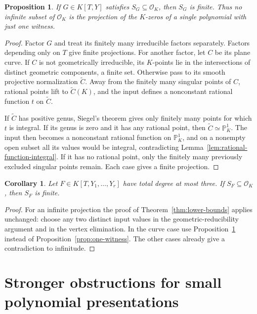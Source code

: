 \documentclass[11pt]{article}
\newtheorem{proposition}[theorem]{Proposition}
\newtheorem{corollary}[theorem]{Corollary}
\theoremstyle{definition}
\begin{document}
\begin{proposition}\label{prop:one-witness-finite}
If $G\in K[T,Y]$ satisfies $S_G\subseteq\mathcal O_K$, then $S_G$ is finite.
Thus no infinite subset of $\mathcal O_K$ is the projection of the
$K$-zeros of a single polynomial with just one witness.
\end{proposition}
\begin{proof}
Factor $G$ and treat its finitely many irreducible factors separately.
Factors depending only on $T$ give finite projections.  For another factor,
let $C$ be its plane curve.  If $C$ is not geometrically irreducible, its
$K$-points lie in the intersections of distinct geometric components,
a finite set.  Otherwise pass to its smooth projective normalization
$\widetilde C$.  Away from the finitely many singular points of $C$,
rational points lift to $\widetilde C(K)$, and the input defines a
nonconstant rational function $t$ on $\widetilde C$.

If $\widetilde C$ has positive genus, Siegel's theorem gives only finitely
many points for which $t$ is integral.  If its genus is zero and it has
any rational point, then $\widetilde C\simeq\mathbb P^1_K$.
The input then becomes a nonconstant rational function on
$\mathbb P^1_K$, and on a nonempty open subset all its values would be
integral, contradicting Lemma~\ref{lem:rational-function-integral}.
If it has no rational point, only the finitely many previously excluded
singular points remain.  Each case gives a finite projection.
\end{proof}

\begin{corollary}\label{cor:cubic-finite}
Let $F\in K[T,Y_1,\ldots,Y_r]$ have total degree at most three.
If $S_F\subseteq\mathcal O_K$, then $S_F$ is finite.
\end{corollary}
\begin{proof}
For an infinite projection the proof of
Theorem~\ref{thm:lower-bounds} applies unchanged: choose any two distinct
input values in the geometric-reducibility argument and in the vertex
elimination.  In the curve case use
Proposition~\ref{prop:one-witness-finite} instead of
Proposition~\ref{prop:one-witness}.  The other cases already give a
contradiction to infinitude.
\end{proof}



\section{Stronger obstructions for small polynomial presentations}
\label{p2lb:scope}
\end{document}
